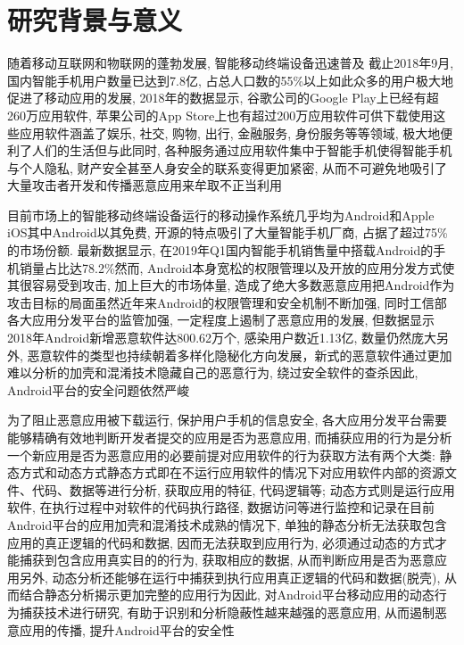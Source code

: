 \section{研究背景与意义}
随着移动互联网和物联网的蓬勃发展, 智能移动终端设备迅速普及\juhao 
截止2018年9月,国内智能手机用户数量已达到7.8亿, 占总人口数的55\%以上\juhao 如此众多的用户极大地促进了移动应用的发展, 2018年的数据显示, 谷歌公司的Google Play上已经有超260万应用软件, 苹果公司的App Store上也有超过200万应用软件可供下载使用\juhao 这些应用软件涵盖了娱乐, 社交, 购物, 出行, 金融服务, 身份服务等等领域, 极大地便利了人们的生活\juhao 但与此同时, 各种服务通过应用软件集中于智能手机使得智能手机与个人隐私, 财产安全甚至人身安全的联系变得更加紧密, 从而不可避免地吸引了大量攻击者开发和传播恶意应用来牟取不正当利用\juhao 

目前市场上的智能移动终端设备运行的移动操作系统几乎均为Android和Apple iOS\juhao 其中Android以其免费, 开源的特点吸引了大量智能手机厂商, 占据了超过75\%的市场份额. 最新数据显示, 在2019年Q1国内智能手机销售量中搭载Android的手机销量占比达78.2\%\juhao 然而, Android本身宽松的权限管理以及开放的应用分发方式使其很容易受到攻击, 加上巨大的市场体量, 造成了绝大多数恶意应用把Android作为攻击目标的局面\juhao 虽然近年来Android的权限管理和安全机制不断加强, 同时工信部各大应用分发平台的监管加强, 一定程度上遏制了恶意应用的发展, 但数据显示2018年Android新增恶意软件达800.62万个, 感染用户数近1.13亿, 数量仍然庞大\juhao 另外, 恶意软件的类型也持续朝着多样化隐秘化方向发展，新式的恶意软件通过更加难以分析的加壳和混淆技术隐藏自己的恶意行为, 绕过安全软件的查杀\juhao 因此, Android平台的安全问题依然严峻\juhao 

为了阻止恶意应用被下载运行, 保护用户手机的信息安全, 各大应用分发平台需要能够精确有效地判断开发者提交的应用是否为恶意应用, 而捕获应用的行为是分析一个新应用是否为恶意应用的必要前提\juhao 对应用软件的行为获取方法有两个大类: 静态方式和动态方式\juhao 静态方式即在不运行应用软件的情况下对应用软件内部的资源文件、代码、数据等进行分析, 获取应用的特征, 代码逻辑等; 动态方式则是运行应用软件, 在执行过程中对软件的代码执行路径, 数据访问等进行监控和记录\juhao 在目前Android平台的应用加壳和混淆技术成熟的情况下, 单独的静态分析无法获取包含应用的真正逻辑的代码和数据, 因而无法获取到应用行为, 必须通过动态的方式才能捕获到包含应用真实目的的行为, 获取相应的数据, 从而判断应用是否为恶意应用\juhao 另外, 动态分析还能够在运行中捕获到执行应用真正逻辑的代码和数据(脱壳), 从而结合静态分析揭示更加完整的应用行为\juhao 因此, 对Android平台移动应用的动态行为捕获技术进行研究, 有助于识别和分析隐蔽性越来越强的恶意应用, 从而遏制恶意应用的传播, 提升Android平台的安全性\juhao

